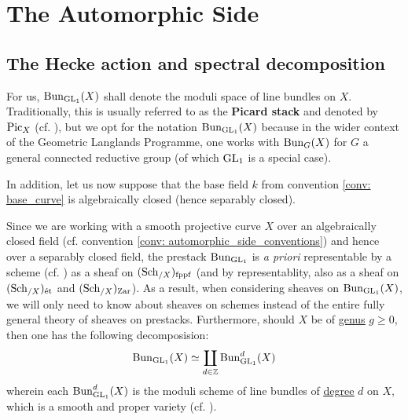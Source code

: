 \section{The Automorphic Side}
    \subsection{The Hecke action and spectral decomposition}
        \begin{convention} \label{conv: automorphic_side_conventions}
            For us, $\mathrm{Bun}_{\operatorname{GL}_1}(X)$ shall denote the moduli space of line bundles on $X$. Traditionally, this is usually referred to as the \textbf{Picard stack} and denoted by $\mathrm{Pic}_X$ (cf. \cite[\href{https://stacks.math.columbia.edu/tag/0372}{Tag 0372}]{stacks}), but we opt for the notation $\mathrm{Bun}_{\operatorname{GL}_1}(X)$ because in the wider context of the Geometric Langlands Programme, one works with $\mathrm{Bun}_G(X)$ for $G$ a general connected reductive group (of which $\operatorname{GL}_1$ is a special case). 
            
            In addition, let us now suppose that the base field $k$ from convention \ref{conv: base_curve} is algebraically closed (hence separably closed).
        \end{convention}
        \begin{remark} \label{remark: geometry_of_the_picard_stack}
            Since we are working with a smooth projective curve $X$ over an algebraically closed field (cf. convention \ref{conv: automorphic_side_conventions}) and hence over a separably closed field, the prestack $\mathrm{Bun}_{\operatorname{GL}_1}$ is \textit{a priori} representable by a scheme (cf. \cite[\href{https://stacks.math.columbia.edu/tag/0B9Z}{Tag 0B9Z}]{stacks}) as a sheaf on $(\mathrm{Sch}_{/X})_{\mathrm{fppf}}$ (and by representablity, also as a sheaf on $(\mathrm{Sch}_{/X})_{\mathrm{\acute{e}t}}$ and $(\mathrm{Sch}_{/X})_{\mathrm{Zar}}$). As a result, when considering sheaves on $\mathrm{Bun}_{\operatorname{GL}_1}(X)$, we will only need to know about sheaves on schemes instead of the entire fully general theory of sheaves on prestacks. Furthermore, should $X$ be of \href{https://stacks.math.columbia.edu/tag/0BY6}{\underline{genus}} $g \geq 0$, then one has the following decomposision:
                $$\mathrm{Bun}_{\operatorname{GL}_1}(X) \simeq \coprod_{d \in \mathbb{Z}} \mathrm{Bun}_{\operatorname{GL}_1}^d(X)$$
            wherein each $\mathrm{Bun}_{\operatorname{GL}_1}^d(X)$ is the moduli scheme of line bundles of \href{https://stacks.math.columbia.edu/tag/0AYQ}{\underline{degree}} $d$ on $X$, which is a smooth and proper variety (cf. \cite[\href{https://stacks.math.columbia.edu/tag/0BA0}{Tag 0BA0}]{stacks}).
        \end{remark}
        
